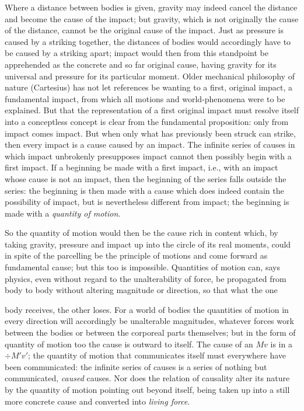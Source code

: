 \documentclass[12pt,a4paper]{book}
\begin{document}
Where a distance between bodies is given, gravity may indeed cancel the distance and become the cause
of the impact; but gravity, which is not originally the cause of the distance, cannot be the original
cause of the impact. Just as pressure is caused by a striking together, the distances of bodies would
accordingly have to be caused by a striking apart; impact would then from this standpoint be
apprehended as the concrete and so far original cause, having gravity for its universal and pressure
for its particular moment. Older mechanical philosophy of nature (Cartesius) has not let references be
wanting to a first, original impact, a fundamental impact, from which all motions and world-phenomena
were to be explained. But that the representation of a first original impact must resolve itself into a
conceptless concept is clear from the fundamental proposition: only from impact comes impact. But when
only what has previously been struck can strike, then every impact is a cause caused by an impact. The
infinite series of causes in which impact unbrokenly presupposes impact cannot then possibly begin with
a first impact. If a beginning be made with a first impact, i.e., with an impact whose cause is not an
impact, then the beginning of the series falls outside the series: the beginning is then made with a
cause which does indeed contain the possibility of impact, but is nevertheless different from impact;
the beginning is made with a \emph{quantity of motion}.

So the quantity of motion would then be the cause rich in content which, by taking gravity, pressure and
impact up into the circle of its real moments, could in spite of the parcelling be the principle of
motions and come forward as fundamental cause; but this too is impossible. Quantities of motion can,
says physics, even without regard to the unalterability of force, be propagated from body to body
without altering magnitude or direction, so that what the one

body receives, the other loses. For a world of bodies the quantities of motion in every
direction will accordingly be unalterable magnitudes, whatever forces work between the bodies or
between the corporeal parts themselves; but in the form of quantity of motion too the cause is
outward to itself.
The cause of an $Mv$ is in a $\div M'v'$; the quantity of motion that communicates itself must
everywhere have been communicated: the infinite series of causes is a series of nothing but
communicated, \emph{caused} causes. Nor does the relation of causality alter its nature by the
quantity of motion pointing out beyond itself, being taken up into a still more concrete cause
and converted into \emph{living force}.
\end{document}
